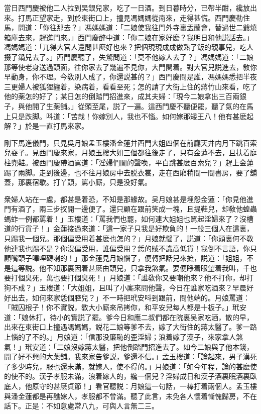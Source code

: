 當日西門慶被他二人拉到吴銀兒家，吃了一日酒。到日暮時分，已帶半酣，纔放出來。打馬正望家走，到於東街口上，撞見馮媽媽從南來，走得甚慌。西門慶勒住馬，問道：「你往那去？」馮媽媽道：「二娘使我往門外寺裏盂蘭會，替過世二爺燒箱庫去來，趕進門來。」西門慶醉中道：「你二娘在家好麽？我明日和他説話去。」馮媽媽道：「兀得大官人還問甚麽好也來？把個現現成成做熟了飯的親事兒，吃人掇了鍋兒去了。」西門慶聽了，失驚問道：「莫不他嫁人去了？」馮媽媽道：「二娘那等使老身送過頭面，往你家去了幾遍不見你，大門関着。對大官兒説進去，敎你早動身，你不理。今敎別人成了，你還説甚的？」西門慶問是誰，馮媽媽悉把半夜三更婦人被狐狸纏着，染病着，看看至死；怎的請了大街上住的蔣竹山來看，吃了他的薬怎的好了；某日怎的倒踏門招進來，成其夫婦：「現今二娘拿出三百兩銀子，與他開了生薬舖。」從頭至尾，説了一遍。這西門慶不聽便罷，聽了氣的在馬上只是跌脚。呌道：「苦哉！你嫁別人，我也不惱。如何嫁那矮王八！他有甚麽起解？」於是一直打馬來家。

剛下馬進儀門，只見吳月娘孟玉樓潘金蓮并西門大姐四個在前廳天井内月下跳百索兒耍子。見西門慶來家，月娘玉樓大姐三個都往後走了，只有金蓮不去，且扶着庭柱兜鞋。被西門慶帶酒駡道：「淫婦們閒的聲喚，平白跳甚麽百索兒？」趕上金蓮踢了兩脚。走到後邊，也不往月娘房中去脱衣裳，走在西廂稍間一間書房，要了舖蓋，那裏宿歇。打丫頭，罵小廝，只是没好氣。

衆婦人站在一處，都甚是着恐，不知是那緣故。吴月娘甚是埋怨金蓮：「你見他進門有酒了，兩三步扠開一邊便了。還只顧在跟前笑成一塊，且提鞋兒，却敎他蝗蟲螞蚱一例都罵着！」玉樓道：「罵我們也罷，如何連大姐姐也駡起淫婦來了？沒槽道的行貨子！」金蓮接過來道：「這一家子只我是好欺負的！一般三個人在這裏，只踢我一個兒。那個偏受用着甚麽也怎的？」月娘就惱了，説道：「你頭裏何不敎他連我也踢不是？你沒偏受用，誰偏受用？恁的賊不識高低貨！我倒不言語，你只顧嘴頭子嗶哩礴喇的！」那金蓮見月娘惱了，便轉把話兒來摭，説道：「姐姐，不是這等説。他不知那裏因着甚麽由頭兒，只拿我煞氣。要便睜着眼望着我叫，千也要打個臭死，萬也要打個臭死！」月娘道：「誰敎你又要嘲他來？他不打你，却打狗不成？」玉樓道：「大姐姐，且叫了小廝來問他聲，今日在誰家吃酒來？早晨好好出去，如何來家恁個腔兒？」不一時把玳安呌到跟前，問他端的。月娘罵道：「賊囚根子！你不實説，敎大小廝來吊拷你，和平安兒每人都是十板子。」玳安道：「娘休打，待小的實説了罷。爹今日和應二叔們都在院裏吴家吃酒，散的早，出來在東街口上撞遇馮媽媽，説花二娘等爹不去，嫁了大街住的蔣太醫了。爹一路上惱的了不的。」月娘道：「信那没廉恥的歪淫婦；浪着嫁了漢子，來家拿人煞氣！」玳安道：「二娘沒嫁蔣太醫，把他倒踏門招進去了。如今二娘與了他本錢，開了好不興的大薬舖。我來家告爹説，爹還不信。」孟玉樓道：「論起來，男子漢死了多少時兒，服也還未滿，就嫁人，使不得的。」月娘道：「如今年程，論的甚麽使的使不的。漢子孝服未滿，浪着嫁人的，纔一個兒？淫婦成日和漢子酒裏眠酒裏臥底人，他原守的甚麽貞節！」看官聽説：月娘這一句話，一棒打着兩個人。孟玉樓與潘金蓮都是再醮嫁人，孝服都不曾滿。聽了此言，未免各人懷着慚愧歸房，不在話下。正是：不如意處常八九，可與人言無二三。

